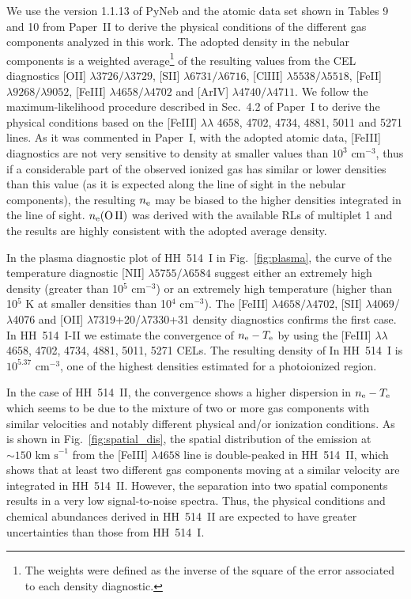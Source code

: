 \documentclass[fleqn,usenatbib]{mnras}
\begin{document}
We use the version 1.1.13 of PyNeb \citep{Luridiana15} and the atomic data set shown in Tables 9 and 10 from Paper~II to derive the physical conditions of the different gas  components analyzed in this work. The adopted density in the nebular components is a weighted average\footnote{The weights were defined as the inverse of the square of the error associated to each density diagnostic.} of the resulting values from the CEL diagnostics
[O\thinspace II] $\lambda3726/\lambda3729$, [S\thinspace II] $\lambda6731/\lambda6716$, [Cl\thinspace III] $\lambda5538/\lambda5518$, [Fe\thinspace II] $\lambda9268/\lambda9052$, [Fe\thinspace III] $\lambda4658/\lambda4702$ and [Ar\thinspace IV]  $\lambda4740/\lambda4711$.  We follow the maximum-likelihood procedure described in Sec.~4.2 of Paper~I to derive the physical conditions based on the [Fe\thinspace III] $\lambda \lambda $ 4658, 4702, 4734, 4881, 5011 and 5271 lines. As it was commented in Paper~I, with the adopted atomic data, [Fe\thinspace III] diagnostics are not very sensitive to density at smaller values than $10^{3} \text{ cm}^{-3}$, thus if a considerable part of the observed ionized gas has similar or lower densities than this value (as it is expected along the line of sight in the nebular components), the resulting $n_{\rm e}$ may be biased to the higher densities integrated in the line of sight. $n_{\rm e}(\text{O\thinspace II})$ was derived with the available RLs of multiplet 1 and the results are highly consistent with the adopted average density.

In the plasma diagnostic plot of HH~514~I in Fig.~\ref{fig:plasma}, the curve of the temperature diagnostic  [N\thinspace II] $\lambda5755/\lambda6584$ suggest either an extremely high density (greater than 10$^5$ cm$^{-3}$) or an extremely high temperature (higher than 10$^{5}$ K at smaller densities than 10$^{4}$ cm$^{-3}$). The [Fe\thinspace III] $\lambda4658/\lambda4702$, [S\thinspace II] $\lambda$4069/$\lambda$4076 and [O\thinspace II] $\lambda$7319+20/$\lambda$7330+31 density diagnostics confirms the first case. In HH~514~I-II we estimate the convergence of $n_{\rm e}-T_{\rm e}$ by using the [Fe\thinspace III] $\lambda \lambda$ 4658, 4702, 4734, 4881, 5011, 5271 CELs. The resulting density of In HH~514~I is $10^{5.37} \text{ cm}^{-3}$, one of the highest densities estimated for a photoionized region. 

In the case of HH~514~II, the convergence shows a higher dispersion in $n_{\rm e}-T_{\rm e}$ which seems to be due to the mixture of two or more gas components with similar velocities and notably different physical and/or ionization conditions. As is shown in Fig.~\ref{fig:spatial_dis}, the spatial distribution of the emission at $\sim 150 \text{ km s}^{-1}$ from the [Fe\thinspace III] $\lambda 4658$ line is double-peaked in HH~514~II, which shows that at least two different gas components moving at a similar velocity are integrated in HH~514~II. However, the separation into two spatial components results in a very low signal-to-noise spectra. Thus, the physical conditions and chemical abundances derived in HH~514~II are expected to have greater uncertainties than those from HH~514~I.
\end{document}

